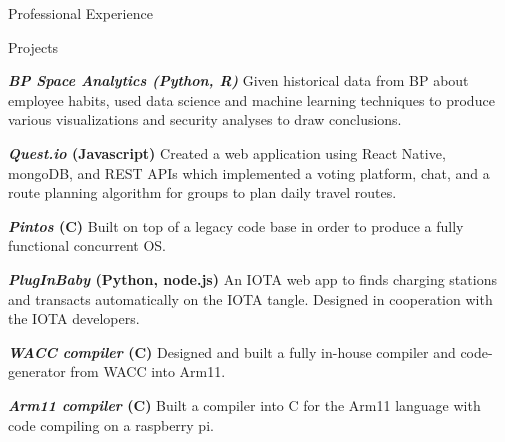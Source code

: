 \documentclass[10pt]{resume} %
\begin{document}
\begin{rSection}{Professional Experience}
%
%
%
%

\end{rSection}


\begin{rSection}{Projects}
    \item \textbf{\textit{BP Space Analytics (Python, R)}} Given historical
    data from BP about employee habits, used data science and machine learning
    techniques to produce various visualizations and security analyses to draw
    conclusions.
    \item \textbf{\textit{Quest.io} (Javascript)} Created a web application
    using React Native, mongoDB, and REST APIs which implemented a voting
    platform, chat, and a route planning algorithm for groups to plan daily
    travel routes.
    \item \textbf{\textit{Pintos} (C)} Built on top of a legacy code base in
    order to produce a fully functional concurrent OS.
    \item \textbf{\textit{PlugInBaby} (Python, node.js)} An IOTA web app
    to finds charging stations and transacts automatically on the IOTA tangle.
    Designed in cooperation with the IOTA developers.
    \item \textbf{\textit{WACC compiler} (C)} Designed and built a fully
    in-house compiler and code-generator from WACC into Arm11.
    \item \textbf{\textit{Arm11 compiler} (C)} Built a compiler into C for the
    Arm11 language with code compiling on a raspberry pi.
\end{rSection}
\end{document}
